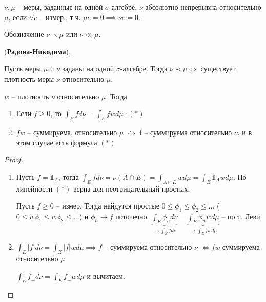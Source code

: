 \begin{definition}
    $\nu, \mu$ -- меры, заданные на одной $\sigma$-алгебре. $\nu$ абсолютно непрерывна относительно $\mu$, если $\forall e$ -- измер., т.ч. $\mu e = 0 \implies \nu e = 0$.

    Обозначение $\nu \prec \mu$ или $\nu \ll \mu$.
\end{definition}


\begin{theorem}
    (\textbf{Радона-Никодима}).

    Пусть меры $\mu$ и $\nu$ заданы на одной $\sigma$-алгебре. Тогда $\nu \prec \mu \Leftrightarrow $ существует плотность меры $\nu$ относительно $\mu$.
\end{theorem}

\begin{theorem}
    $w$ --  плотность $\nu$ относительно $\mu$. Тогда 

    \begin{enumerate}
        \item Если $f \geq 0$, то $\int_E f d \nu = \int_E f w d \mu \ : (*)$
        \item $fw$ -- суммируема, относительно $\mu$ $\Leftrightarrow$ f -- суммируема относительно $\nu$, и в этом случае есть формула $(*)$
    \end{enumerate}
\end{theorem}
\begin{proof}
    \begin{enumerate}
        \item {
            Пусть $f = \mathds{1}_A$, тогда $\int_E f d \nu = \nu (A \cap E) = \int_{A \cap E} w d \mu = \int_E \mathds{1}_A w d \mu$. По линейности $(*)$ верна для неотрицательный простых.

            Пусть $f \geq 0$ -- измер. Тогда найдутся простые $0 \leq \phi_1 \leq \phi_2 \leq \dots$ ($0 \leq w \phi_1 \leq w \phi_2 \leq \dots$) и $\phi_n \rightarrow f$ поточечно. $\underbrace{\int_E \phi_n d \nu}_{\rightarrow \int_E f d \nu} = \underbrace{\int_E \phi_n w d \mu}_{\rightarrow \int_E f w d \mu}$ -- по т. Леви.
        }
        \item {
            $\int_E |f| d \nu = \int_E |f| w d \mu \implies f$ -- суммируема относительно $\nu$ $\Leftrightarrow f w$ суммируема относительно $\mu$

            $\int_E f_{\pm} d \nu = \int_E f_{\pm} w d \mu$ и вычитаем.
        }
    \end{enumerate}
\end{proof}
